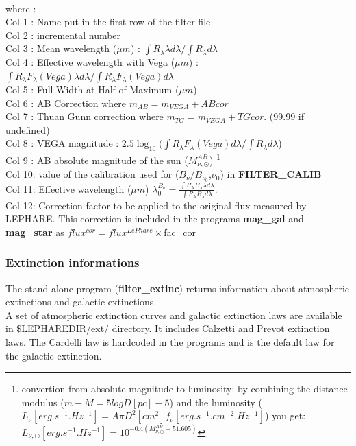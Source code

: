 \documentclass[12pt]{article}
\begin{document}
%
\\
where : \\
 Col 1 : Name put in the first row of the filter file \\
 Col 2 : incremental number \\
 Col 3 : Mean wavelength ($\mu m$) : $ \int R_{\lambda} \lambda d\lambda / \int R_{\lambda} d\lambda $ \\ 
 Col 4 : Effective  wavelength with Vega ($\mu m$) : $ \int R_{\lambda} F_{\lambda}(Vega)\lambda d\lambda / \int R_{\lambda}F_{\lambda}(Vega) d\lambda $ \\
 Col 5 : Full Width at Half of Maximum ($\mu m$) \\
 Col 6 : AB Correction where $m_{AB} = m_{VEGA} + ABcor$ \\
 Col 7 : Thuan Gunn correction where $m_{TG} = m_{VEGA} + TGcor$. (99.99 if undefined) \\
 Col 8 : VEGA magnitude :    $2.5\log_{10}(\int R_{\lambda} F_{\lambda}(Vega) d\lambda / \int R_{\lambda} d\lambda$)\\
 Col 9 : AB absolute magnitude of the sun ($M^{AB}_{\nu,\odot}$) \footnote{ convertion from absolute magnitude to luminosity: by combining the
           distance modulus  ($m-M=5log D[pc]-5$) and the luminosity ($L_{\nu}[erg.s^{-1}.Hz^{-1}]= A\pi D^2[cm^2] f_{\nu}[erg.s^{-1}.cm^{-2}.Hz^{-1}]$)
           you get:  $L_{\nu,\odot}[erg.s^{-1}.Hz^{-1}]=10^{-0.4(M^{AB}_{\nu,\odot} -51.605)}$    }\\
 Col 10: value of the calibration used for ($B_{\nu}/B_{\nu_0}$,$\nu_0$) in {\bf FILTER\_CALIB} \\
 Col 11: Effective  wavelength ($\mu m$)  $\lambda_{0}^{B_{\nu}}= \frac{\int R_{\lambda} B_{\lambda} \lambda d\lambda}{\int R_{\lambda}  B_{\lambda}  d\lambda}$.\\
 Col 12: Correction factor to be applied to the original flux measured by LEPHARE. 
             This correction is included in the programs {\bf mag\_gal} and {\bf mag\_star} as
             $flux^{cor}= flux^{LePhare}\times$fac\_cor \\ 
%
\subsubsection{Extinction informations}

 The stand alone program ({\bf filter\_extinc}) returns information about  atmospheric extinctions and galactic extinctions.\\
  A set of atmospheric extinction curves  and  galactic extinction laws are
  available in \$LEPHAREDIR/ext/ directory.   
 It includes Calzetti and Prevot extinction laws. The Cardelli law is hardcoded in the programs and is the default law for the galactic extinction. \\
\end{document}

